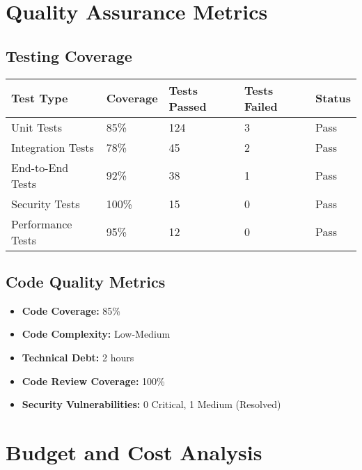 \documentclass[12pt,a4paper]{article}
\begin{document}
\section{Quality Assurance Metrics}

\subsection{Testing Coverage}
\begin{longtable}{|p{3cm}|p{3cm}|p{3cm}|p{3cm}|p{2cm}|}
\hline
\rowcolor{lightgray}
\textbf{Test Type} & \textbf{Coverage} & \textbf{Tests Passed} & \textbf{Tests Failed} & \textbf{Status} \\
\hline
Unit Tests & 85\% & 124 & 3 & \cellcolor{completedgreen}Pass \\
\hline
Integration Tests & 78\% & 45 & 2 & \cellcolor{completedgreen}Pass \\
\hline
End-to-End Tests & 92\% & 38 & 1 & \cellcolor{completedgreen}Pass \\
\hline
Security Tests & 100\% & 15 & 0 & \cellcolor{completedgreen}Pass \\
\hline
Performance Tests & 95\% & 12 & 0 & \cellcolor{completedgreen}Pass \\
\hline
\end{longtable}

\subsection{Code Quality Metrics}
\begin{itemize}
    \item \textbf{Code Coverage:} 85\%
    \item \textbf{Code Complexity:} Low-Medium
    \item \textbf{Technical Debt:} 2 hours
    \item \textbf{Code Review Coverage:} 100\%
    \item \textbf{Security Vulnerabilities:} 0 Critical, 1 Medium (Resolved)
\end{itemize}

\section{Budget and Cost Analysis}
\end{document}
